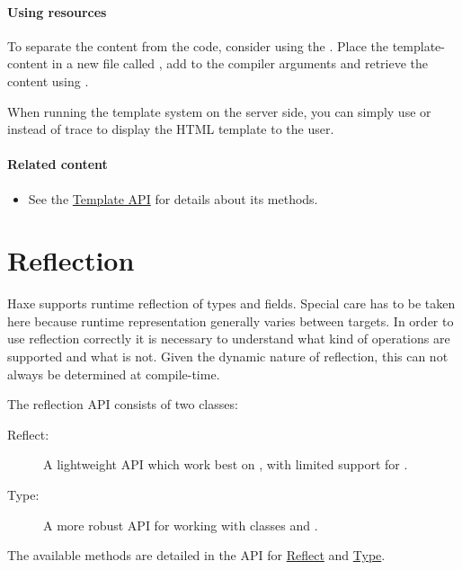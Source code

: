\paragraph{Using resources}

To separate the content from the code, consider using the . 
Place the template-content in a new file called , add  to the compiler arguments and retrieve the content using .

When running the template system on the server side, you can simply use  or  instead of trace to display the HTML template to the user.

\paragraph{Related content}
\begin{itemize}
	\item See the \href{https://api.haxe.org/haxe/Template.html}{Template API} for details about its methods.
\end{itemize}

\section{Reflection}
\label{std-reflection}

Haxe supports runtime reflection of types and fields. Special care has to be taken here because runtime representation generally varies between targets. In order to use reflection correctly it is necessary to understand what kind of operations are supported and what is not. Given the dynamic nature of reflection, this can not always be determined at compile-time.

The reflection API consists of two classes:

\begin{description}
	\item[Reflect:] A lightweight API which work best on , with limited support for . 
	\item[Type:] A more robust API for working with classes and .
\end{description}

The available methods are detailed in the API for \href{https://api.haxe.org/Reflect.html}{Reflect} and \href{https://api.haxe.org/Type.html}{Type}.

